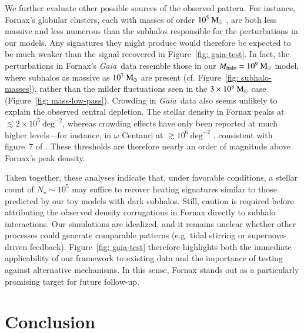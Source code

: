 \documentclass[fleqn,usenatbib]{mnras}
\newcommand{\gaia}{{\sl Gaia}}
\newcommand{\msun}{\rm M_\odot}
\begin{document}
We further evaluate other possible sources of the observed pattern. For instance, Fornax’s globular clusters, each with masses of order $10^{5}~\msun$ \citep{deBoer&Fraser16}, are both less massive and less numerous than the subhalos responsible for the perturbations in our models. Any signatures they might produce would therefore be expected to be much weaker than the signal recovered in Figure~\ref{fig: gaia-test}. In fact, the perturbations in Fornax’s \gaia\ data resemble those in our $M_{\rm halo} = 10^{9}~\msun$ model, where subhalos as massive as $10^{7}~\msun$ are present (cf. Figure~\ref{fig: subhalo-masses}), rather than the milder fluctuations seen in the $3 \times 10^{8}~\msun$ case (Figure~\ref{fig: mass-low-pass}).
Crowding in \gaia\ data also seems unlikely to explain the observed central depletion. The stellar density in Fornax peaks at $\lesssim 2\times 10^{5}~\mathrm{deg}^{-2}$, whereas crowding effects have only been reported at much higher levels—for instance, in $\omega$ Centauri at $\gtrsim 10^{6}~\mathrm{deg}^{-2}$ \citep{Gaia-omegaCen23}, consistent with figure~7 of \cite{Arenou+18}. These thresholds are therefore nearly an order of magnitude above Fornax's peak density.

Taken together, these analyses indicate that, under favorable conditions, a stellar count of $N_{\star} \sim 10^{5}$ may suffice to recover heating signatures similar to those predicted by our toy models with dark subhalos. 
Still, caution is required before attributing the observed density corrugations in Fornax directly to subhalo interactions. Our simulations are idealized, and it remains unclear whether other processes could generate comparable patterns (e.g. tidal stirring or supernova-driven feedback). Figure~\ref{fig: gaia-test} therefore highlights both the immediate applicability of our framework to existing data and the importance of testing against alternative mechanisms. In this sense, Fornax stands out as a particularly promising target for future follow-up.

\section{Conclusion} \label{sec: conclusion}
\end{document}
